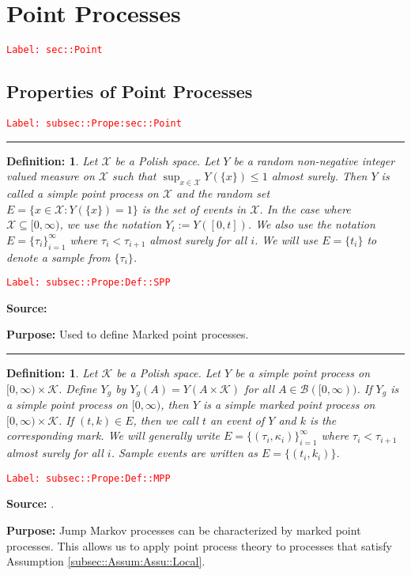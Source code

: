 \documentclass[12pt]{article}
\newcommand{\mc}{\mathcal}
\newcommand{\ms}{\mathscr}
\newcommand{\tr}{\textcolor{red}}
\newcommand{\labe}[1]{\tr{\texttt{Label: #1}}}
\newcommand{\purpose}{\textbf{Purpose: }}
\newcommand{\lin}{\rule{\linewidth}{0.4 pt}}
\newtheorem{defn}[thms]{Definition: }
\begin{document}
\section{Point Processes}
\label{sec::Point}\labe{sec::Point}

\subsection{Properties of Point Processes}
\label{subsec::Prope:sec::Point}\labe{subsec::Prope:sec::Point}

\lin

\begin{defn}
Let \(\mc{X}\) be a Polish space. Let \(Y\) be a random non-negative integer valued measure on \(\mc{X}\) such that \(\sup_{x \in \mc{X}} Y(\{x\})\leq 1\) almost surely. Then \(Y\) is called a simple point process on \(\mc{X}\) and the random set \(E = \{x \in \mc{X}: Y(\{x\}) = 1\}\) is the set of events in \(\mc{X}\). In the case where \(\mc{X} \subseteq [0,\infty)\), we use the notation \(Y_t := Y([0,t])\). We also use the notation \(E = \{\tau_i\}_{i=1}^{\infty}\) where \(\tau_i < \tau_{i+1}\) almost surely for all \(i\). We will use \(E = \{t_i\}\) to denote a sample from \(\{\tau_i\}\).
\label{subsec::Prope:Def::SPP}
\end{defn}
\labe{subsec::Prope:Def::SPP}

\textbf{Source: }\cite[Definition 9.1.II]{DalVer08}

\purpose Used to define Marked point processes.

\lin

\begin{defn}
Let \(\mc{K}\) be a Polish space. Let \(Y\) be a simple point process on \([0,\infty)\times \mc{K}\). Define \(Y_g\) by \(Y_g(A) = Y(A\times \mc{K})\) for all \(A \in \ms{B}([0,\infty))\). If \(Y_g\) is a simple point process on \([0,\infty)\), then \(Y\) is a simple marked point process on \([0,\infty)\times \mc{K}\). If \((t,k) \in E\), then we call \(t\) an event of \(Y\) and \(k\) is the corresponding mark. We will generally write \(E = \{(\tau_i,\kappa_i)\}_{i=1}^{\infty}\) where \(\tau_i < \tau_{i+1}\) almost surely for all \(i\). Sample events are written as \(E = \{(t_i,k_i)\}\). 
\label{subsec::Prope:Def::MPP}
\end{defn}
\labe{subsec::Prope:Def::MPP}

\textbf{Source: }\cite[Definition 6.4.I]{DalVer03}.

\purpose Jump Markov processes can be characterized by marked point processes. This allows us to apply point process theory to processes that satisfy Assumption \ref{subsec::Assum:Assu::Local}.
\end{document}
